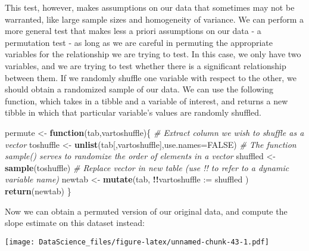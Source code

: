 \documentclass[
]{book}
\newenvironment{Shaded}{\begin{snugshade}}{\end{snugshade}}
\newcommand{\CommentTok}[1]{\textcolor[rgb]{0.56,0.35,0.01}{\textit{#1}}}
\newcommand{\ControlFlowTok}[1]{\textcolor[rgb]{0.13,0.29,0.53}{\textbf{#1}}}
\newcommand{\DataTypeTok}[1]{\textcolor[rgb]{0.13,0.29,0.53}{#1}}
\newcommand{\KeywordTok}[1]{\textcolor[rgb]{0.13,0.29,0.53}{\textbf{#1}}}
\newcommand{\NormalTok}[1]{#1}
\newcommand{\OperatorTok}[1]{\textcolor[rgb]{0.81,0.36,0.00}{\textbf{#1}}}
\newcommand{\OtherTok}[1]{\textcolor[rgb]{0.56,0.35,0.01}{#1}}
\newcommand{\StringTok}[1]{\textcolor[rgb]{0.31,0.60,0.02}{#1}}
\begin{document}
This test, however, makes assumptions on our data that sometimes may not be warranted, like large sample sizes and homogeneity of variance. We can perform a more general test that makes less a priori assumptions on our data - a permutation test - as long as we are careful in permuting the appropriate variables for the relationship we are trying to test. In this case, we only have two variables, and we are trying to test whether there is a significant relationship between them. If we randomly shuffle one variable with respect to the other, we should obtain a randomized sample of our data. We can use the following function, which takes in a tibble and a variable of interest, and returns a new tibble in which that particular variable's values are randomly shuffled.

\begin{Shaded}
\begin{Highlighting}[]
\NormalTok{permute \textless{}{-}}\StringTok{ }\ControlFlowTok{function}\NormalTok{(tab,vartoshuffle)\{}
  \CommentTok{\# Extract column we wish to shuffle as a vector}
\NormalTok{  toshuffle \textless{}{-}}\StringTok{ }\KeywordTok{unlist}\NormalTok{(tab[,vartoshuffle],}\DataTypeTok{use.names=}\OtherTok{FALSE}\NormalTok{)}
  \CommentTok{\# The function sample() serves to randomize the order of elements in a vector}
\NormalTok{  shuffled \textless{}{-}}\StringTok{ }\KeywordTok{sample}\NormalTok{(toshuffle)}
  \CommentTok{\# Replace vector in new table (use !! to refer to a dynamic variable name)}
\NormalTok{  newtab \textless{}{-}}\StringTok{ }\KeywordTok{mutate}\NormalTok{(tab, }\OperatorTok{!!}\DataTypeTok{vartoshuffle :=}\NormalTok{ shuffled )}
  \KeywordTok{return}\NormalTok{(newtab)}
\NormalTok{\}}
\end{Highlighting}
\end{Shaded}

Now we can obtain a permuted version of our original data, and compute the slope estimate on this dataset instead:

\begin{Shaded}
\end{Shaded}

\texttt{[image: DataScience\_files/figure-latex/unnamed-chunk-43-1.pdf]}
\end{document}
